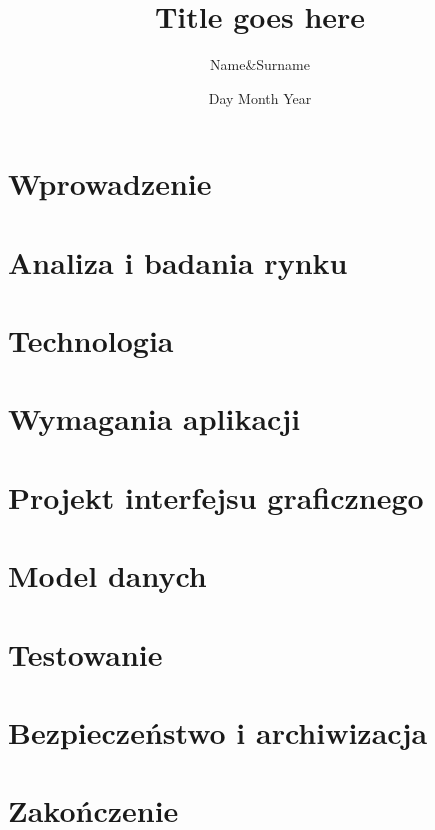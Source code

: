 \documentclass[12pt]{report}
\title{Title goes here}
\author{Name&Surname}
\date{Day Month Year}
\begin{document}

\tableofcontents

\listoffigures

\chapter{Wprowadzenie}


\chapter{Analiza i badania rynku}


\chapter{Technologia}


\chapter{Wymagania aplikacji}


\chapter{Projekt interfejsu graficznego}


\chapter{Model danych}


\chapter{Testowanie}


\chapter{Bezpieczeństwo i archiwizacja}


\chapter{Zakończenie}


\printbibliography[heading=bibintoc, title={Bibliografia}]
\end{document}
